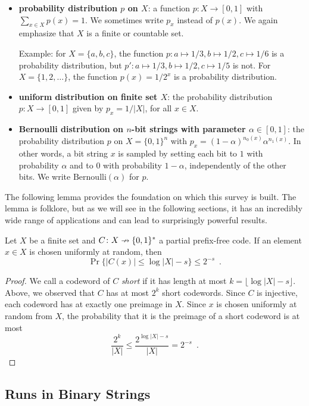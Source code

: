 \documentclass[format=acmsmall, review=false, screen=true]{acmart}
\begin{document}
\begin{itemize}
\item \textbf{probability distribution $p$ 
on $X$}: a function $p: X \rightarrow [0,1]$ with
  $\sum_{x \in X} p(x) = 1$. We sometimes write
  $p_x$ instead of $p(x)$. We again emphasize
  that $X$ is a finite or countable set.

Example: for $X = \{a,b,c\}$, the function
  $p: a \mapsto 1/3, b \mapsto 1/2, c \mapsto 1/6$ is 
  a probability distribution, but 
  $p': a \mapsto 1/3, b \mapsto 1/2, c \mapsto 1/5$ is not.
  For $X = \{1, 2, \dots \}$, the function
  $p(x) = 1/2^{x}$ is a probability distribution.
\item \textbf{uniform distribution on finite set $X$}:
  the probability distribution $p: X \rightarrow [0,1]$
  given by $p_x = 1/|X|$, for all $x \in X$.
\item \textbf{Bernoulli distribution on $n$-bit strings
with parameter $\alpha \in [0,1]$}: the probability
distribution $p$ on $X = \{0, 1\}^n$ with
$p_x = (1-\alpha)^{n_0(x)}\alpha^{n_1(x)}$.
In other words, a bit string $x$ is sampled
by setting each bit to $1$ with probability $\alpha$ and to 
$0$ with probability $1-\alpha$,
independently of the other bits.
We write $\mathrm{Bernoulli}(\alpha)$ for $p$.
\end{itemize}
The following lemma provides the foundation on which this
survey is built. The lemma is folklore, but as we will see in
the following sections, it has an incredibly wide range of
applications and can lead to surprisingly powerful results.
\begin{lem}
  Let $X$ be a finite set and 
  $C\colon X\nrightarrow \{0,1\}^*$ a partial prefix-free
  code. If an element $x\in X$ is chosen uniformly at random, then
  \[
    \Pr\{|C(x)|\le \log|X|-s\}\le 2^{-s} \enspace .
  \]
\end{lem}

\begin{proof}
  We call a codeword of
  $C$ \emph{short} if it has length at most 
  $k = \lfloor \log|X|-s \rfloor$. Above, we observed that
  $C$ has at most $2^{k}$ short codewords.  Since $C$ is injective,
  each codeword has at exactly one preimage in $X$.  
  Since $x$ is chosen uniformly at
  random from $X$, the probability that it is the preimage of a 
  short codeword is at most
  \[
  \frac{2^k}{|X|} \leq \frac{2^{\log|X|-s}}{|X|} = 2^{-s} \enspace
  . 
  \]
\end{proof}

\subsection{Runs in Binary Strings}
\end{document}
